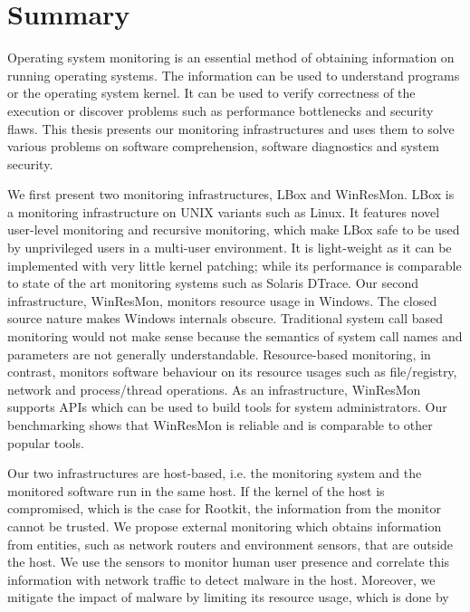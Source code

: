 \chapter{Summary}

Operating system monitoring is an essential method of obtaining
information on running operating systems.
The information can be used to understand programs or
the operating system kernel.
It can be used to verify correctness of the execution or
discover problems such as performance bottlenecks and security flaws.
This thesis presents our monitoring infrastructures and uses them to solve
various problems on software comprehension, software diagnostics and
system security.

We first present two monitoring infrastructures, LBox and WinResMon.
LBox is a monitoring infrastructure on UNIX variants such as Linux.
It features novel user-level monitoring and recursive monitoring, which
make LBox safe to be used by unprivileged users in a multi-user environment.
It is light-weight as it can be implemented with very little kernel patching;
while its performance is comparable to state of the art monitoring systems
such as Solaris DTrace.
Our second infrastructure, WinResMon, monitors resource usage in Windows.
The closed source nature makes Windows internals obscure.
Traditional system call based monitoring would not make sense
because the semantics of system call names and parameters are not
generally understandable.
Resource-based monitoring, in contrast,
monitors software behaviour on its resource usages such as
file/registry, network and process/thread operations.
As an infrastructure, WinResMon supports APIs which
can be used to build tools for system administrators.
Our benchmarking shows that WinResMon is reliable and
is comparable to other popular tools.

Our two infrastructures are host-based, i.e.
the monitoring system and the monitored software run in the same host.
If the kernel of the host is compromised,
which is the case for Rootkit,
the information from the monitor cannot be trusted.
We propose external monitoring which obtains information from entities,
such as network routers and environment sensors, that are outside the host.
We use the sensors to monitor human user presence and correlate
this information with network traffic to detect malware in the host.
Moreover, we mitigate the impact of malware by limiting its resource usage,
which is done by adapting WinResMon from resource usage monitoring to
resource usage control.

